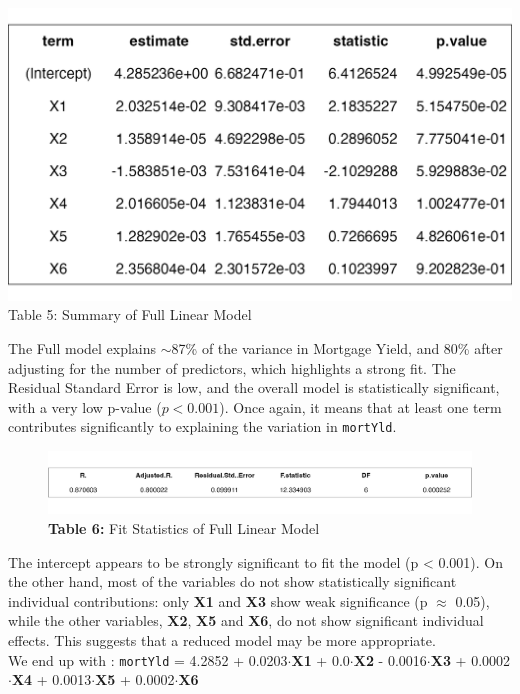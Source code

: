 \documentclass[
  11pt,
]{article}
\begin{document}
\begin{minipage}{0.42\textwidth}
\includegraphics[width=1\linewidth]{full_model_summary_table.png}
\vspace{-0.2em}
\footnotesize Table 5: Summary of Full Linear Model
\end{minipage}
\hfill
\begin{minipage}{0.55\textwidth}
The Full model explains $\sim$87\% of the variance in Mortgage Yield, and 80\% after adjusting for the number of predictors, which highlights a strong fit. The Residual Standard Error is low, and the overall model is statistically significant, with a very low p-value ($p < 0.001$). Once again, it means that at least one term contributes significantly to explaining the variation in \texttt{mortYld}.
\end{minipage}

\noindent

\begin{figure}[H]
  \centering
  \includegraphics[width=0.9\linewidth, height=0.15\textheight]{full_model_fitstats_table.png}
  \vspace{-6pt}
  \caption*{\footnotesize \textbf{Table 6:} Fit Statistics of Full Linear Model}
\end{figure}
\addtocounter{table}{2}

The intercept appears to be strongly significant to fit the model (p
\textless{} 0.001). On the other hand, most of the variables do not show
statistically significant individual contributions: only \textbf{X1} and
\textbf{X3} show weak significance (p \(\approx\) 0.05), while the other
variables, \textbf{X2}, \textbf{X5} and \textbf{X6}, do not show
significant individual effects. This suggests that a reduced model may
be more appropriate.\\
We end up with : \texttt{mortYld} = 4.2852 + 0.0203\(\cdot\)\textbf{X1}
+ 0.0\(\cdot\)\textbf{X2} - 0.0016\(\cdot\)\textbf{X3} +
0.0002\(\cdot\)\textbf{X4} + 0.0013\(\cdot\)\textbf{X5} +
0.0002\(\cdot\)\textbf{X6}
\end{document}
